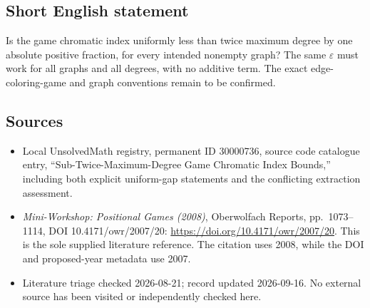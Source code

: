 \documentclass[11pt]{article}
\begin{document}
\subsection{Short English statement}
Is the game chromatic index uniformly less than twice maximum degree by one absolute positive fraction, for every intended nonempty graph? The same \(\varepsilon\) must work for all graphs and all degrees, with no additive term. The exact edge-coloring-game and graph conventions remain to be confirmed.
\subsection{Sources}
\begin{itemize}
\item Local UnsolvedMath registry, permanent ID 30000736, source code catalogue entry, ``Sub-Twice-Maximum-Degree Game Chromatic Index Bounds,'' including both explicit uniform-gap statements and the conflicting extraction assessment.
\item \emph{Mini-Workshop: Positional Games (2008)}, Oberwolfach Reports, pp.\ 1073--1114, DOI 10.4171/owr/2007/20: \url{https://doi.org/10.4171/owr/2007/20}. This is the sole supplied literature reference. The citation uses 2008, while the DOI and proposed-year metadata use 2007.
\item Literature triage checked 2026-08-21; record updated 2026-09-16. No external source has been visited or independently checked here.
\end{itemize}
\end{document}
